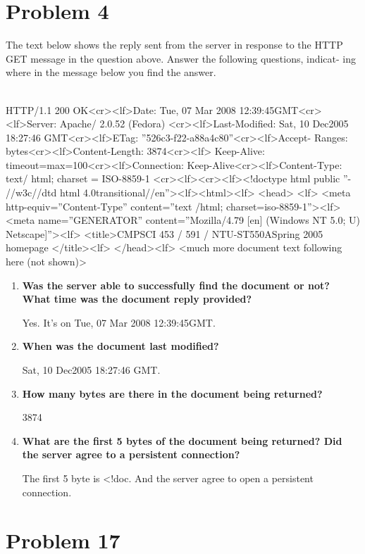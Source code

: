\documentclass[11pt]{article}
\newenvironment{qparts}{\begin{enumerate}[{(}a{)}]}{\end{enumerate}}
\begin{document}
\newpage
\section{Problem 4}

The text below shows the reply sent from the server in response to the HTTP GET message in the question above. Answer the following questions, indicat- ing where in the message below you find the answer.

~\\

HTTP/1.1 200 OK<cr><lf>Date: Tue, 07 Mar 2008 12:39:45GMT<cr><lf>Server: Apache/ 2.0.52 (Fedora) <cr><lf>Last-Modified: Sat, 10 Dec2005 18:27:46 GMT<cr><lf>ETag: ”526c3-f22-a88a4c80”<cr><lf>Accept- Ranges: bytes<cr><lf>Content-Length: 3874<cr><lf> Keep-Alive: timeout=max=100<cr><lf>Connection: Keep-Alive<cr><lf>Content-Type: text/ html; charset = ISO-8859-1 <cr><lf><cr><lf><!doctype html public ”- //w3c//dtd html 4.0transitional//en”><lf><html><lf> <head> <lf> <meta http-equiv=”Content-Type” content=”text /html; charset=iso-8859-1”><lf> <meta name=”GENERATOR” content=”Mozilla/4.79 [en] (Windows NT 5.0; U) Netscape]”><lf> <title>CMPSCI 453 / 591 / NTU-ST550ASpring 2005 homepage </title><lf> </head><lf> <much more document text following here (not shown)>

\begin{qparts}
	\item \textbf{Was the server able to successfully find the document or not? What time was the document reply provided?
}

	Yes. It's on Tue, 07 Mar 2008 12:39:45GMT.
	
	\item \textbf{When was the document last modified?}
	
	Sat, 10 Dec2005 18:27:46 GMT.
	
	\item \textbf{How many bytes are there in the document being returned?}
	
	3874
	
	\item \textbf{What are the first 5 bytes of the document being returned? Did the server agree to a persistent connection?}

	The first 5 byte is <!doc. And the server agree to open a persistent connection.

\end{qparts}

\newpage
\section{Problem 17}
\end{document}
